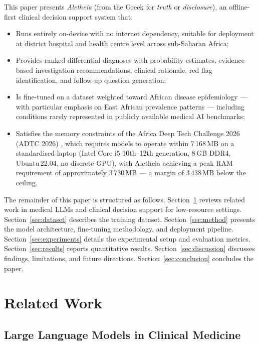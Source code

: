 \documentclass[journal]{IEEEtran}
\begin{document}
This paper presents \textit{Aletheia} (from the Greek for
\textit{truth} or \textit{disclosure}), an offline-first clinical
decision support system that:
\begin{itemize}
  \item Runs entirely on-device with no internet dependency,
        suitable for deployment at district hospital and health
        centre level across sub-Saharan Africa;
  \item Provides ranked differential diagnoses with probability
        estimates, evidence-based investigation recommendations,
        clinical rationale, red flag identification, and follow-up
        question generation;
  \item Is fine-tuned on a dataset weighted toward African disease
        epidemiology --- with particular emphasis on East African
        prevalence patterns --- including conditions rarely represented
        in publicly available medical AI benchmarks;
  \item Satisfies the memory constraints of the Africa Deep Tech
        Challenge 2026 (ADTC 2026) \cite{adtc2026}, which requires
        models to operate within 7\,168\,MB on a standardised laptop
        (Intel Core i5 10th--12th generation, 8\,GB DDR4,
        Ubuntu\,22.04, no discrete GPU), with Aletheia achieving a
        peak RAM requirement of approximately 3\,730\,MB --- a margin
        of 3\,438\,MB below the ceiling.
\end{itemize}

The remainder of this paper is structured as follows.
Section~\ref{sec:related} reviews related work in medical LLMs
and clinical decision support for low-resource settings.
Section~\ref{sec:dataset} describes the training dataset.
Section~\ref{sec:method} presents the model architecture, fine-tuning
methodology, and deployment pipeline.
Section~\ref{sec:experiments} details the experimental setup and
evaluation metrics.
Section~\ref{sec:results} reports quantitative results.
Section~\ref{sec:discussion} discusses findings, limitations, and
future directions.
Section~\ref{sec:conclusion} concludes the paper.

\section{Related Work}
\label{sec:related}

\subsection{Large Language Models in Clinical Medicine}
\end{document}
